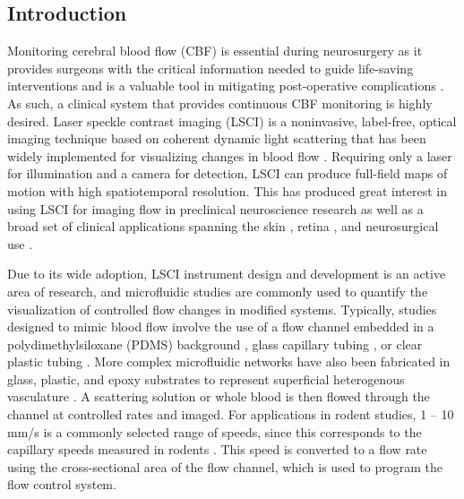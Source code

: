 \documentclass[12pt]{spieman}
\begin{document}
\begin{spacing}{2}


\section{Introduction}
\label{sect:introduction}

Monitoring cerebral blood flow (CBF) is essential during neurosurgery as it provides surgeons with the critical information needed to guide life-saving interventions and is a valuable tool in mitigating post-operative complications \cite{Kirkness.2005}. As such, a clinical system that provides continuous CBF monitoring is highly desired. Laser speckle contrast imaging (LSCI) is a noninvasive, label-free, optical imaging technique based on coherent dynamic light scattering that has been widely implemented for visualizing changes in blood flow \cite{Briers:2001hy,Boas:2010vr}. Requiring only a laser for illumination and a camera for detection, LSCI can produce full-field maps of motion with high spatiotemporal resolution. This has produced great interest in using LSCI for imaging flow in preclinical neuroscience research \cite{Dunn:2001dj,Ayata:2004ba,Bolay:2002jg,Durduran.2004} as well as a broad set of clinical applications spanning the skin \cite{Briers:1996kfa,Choi:2004jn}, retina \cite{Briers.1982,Srienc.2010}, and neurosurgical use \cite{Hecht:2009gu,Parthasarathy:2010gh,Klijn:2012ls}.

Due to its wide adoption, LSCI instrument design and development is an active area of research, and microfluidic studies are commonly used to quantify the visualization of controlled flow changes in modified systems. Typically, studies designed to mimic blood flow involve the use of a flow channel embedded in a polydimethylsiloxane (PDMS) background \cite{Parthasarathy:2008el}, glass capillary tubing \cite{Choi:2004jn}, or clear plastic tubing \cite{Miao:2014}. More complex microfluidic networks have also been fabricated in glass, plastic, and epoxy substrates to represent superficial heterogenous vasculature \cite{Luu.2012}. A scattering solution \cite{Parthasarathy:2008el} or whole blood\cite{Choi:2004jn,Miao:2014} is then flowed through the channel at controlled rates and imaged. For applications in rodent studies, 1 -- 10 mm/s is a commonly selected range of speeds, since this corresponds to the capillary speeds measured in rodents \cite{Tomita:2008do}. This speed is converted to a flow rate using the cross-sectional area of the flow channel, which is used to program the flow control system.


\end{spacing}
\end{document}
